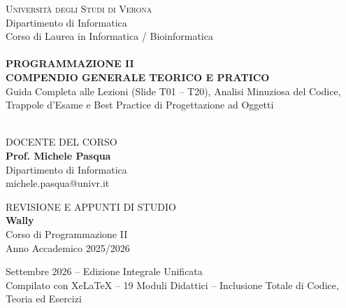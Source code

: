 \documentclass[11pt,a4paper,oneside]{report}
\begin{document}
\begin{titlepage}
\centering
\vspace*{0.5cm}

{\Large\sffamily\scshape Università degli Studi di Verona}\\[0.3em]
{\large\sffamily Dipartimento di Informatica}\\[0.2em]
{\normalsize\sffamily Corso di Laurea in Informatica / Bioinformatica}\\[1.8cm]

\noindent{\color{accentblue}\rule{\textwidth}{2pt}}\\[0.8cm]

{\fontsize{28pt}{34pt}\selectfont\bfseries\sffamily\color{brandblue} PROGRAMMAZIONE II}\\[0.5cm]
{\LARGE\bfseries\sffamily\color{accentblue} COMPENDIO GENERALE TEORICO E PRATICO}\\[0.8cm]
{\large\sffamily Guida Completa alle Lezioni (Slide T01 -- T20), Analisi Minuziosa del Codice,\\ Trappole d'Esame e Best Practice di Progettazione ad Oggetti}\\[0.8cm]

\noindent{\color{accentblue}\rule{\textwidth}{0.8pt}}\\[2.2cm]

\begin{minipage}[t]{0.48\textwidth}
  {\small\sffamily\color{gray}DOCENTE DEL CORSO}\\[0.3em]
  {\large\bfseries\sffamily Prof. Michele Pasqua}\\[0.2em]
  {\small\sffamily Dipartimento di Informatica}\\
  {\small\ttfamily michele.pasqua@univr.it}
\end{minipage}
\hfill
\begin{minipage}[t]{0.48\textwidth}
  \begin{flushright}
    {\small\sffamily\color{gray}REVISIONE E APPUNTI DI STUDIO}\\[0.3em]
    {\large\bfseries\sffamily Wally}\\[0.2em]
    {\small\sffamily Corso di Programmazione II}\\
    {\small\sffamily Anno Accademico 2025/2026}
  \end{flushright}
\end{minipage}

\vfill

{\small\sffamily\color{gray} Settembre 2026 -- Edizione Integrale Unificata}\\[0.2em]
{\footnotesize\sffamily Compilato con XeLaTeX -- 19 Moduli Didattici -- Inclusione Totale di Codice, Teoria ed Esercizi}

\end{titlepage}
\end{document}
